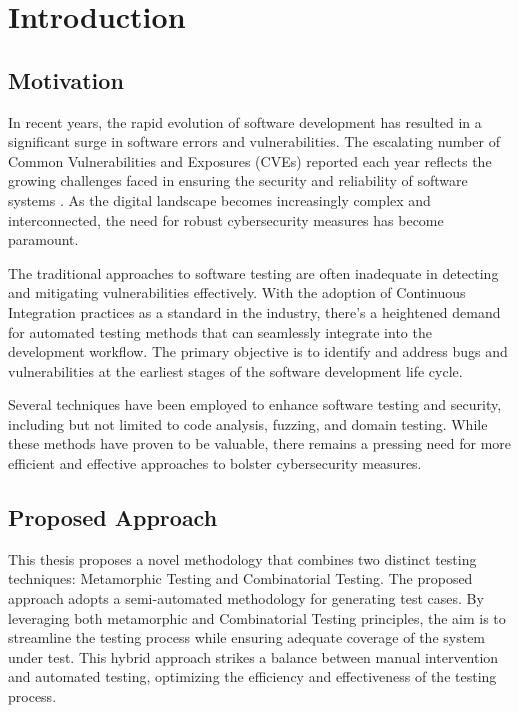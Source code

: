 
\chapter{Introduction}\label{ch:intro}

\section{Motivation}\label{sec:motivation}

In recent years, the rapid evolution of software development has resulted in a significant surge in software errors and vulnerabilities.
The escalating number of Common Vulnerabilities and Exposures (CVEs) reported each year reflects the growing challenges faced in ensuring the security and reliability of software systems \cite{CVE}.
As the digital landscape becomes increasingly complex and interconnected, the need for robust cybersecurity measures has become paramount.

The traditional approaches to software testing are often inadequate in detecting and mitigating vulnerabilities effectively.
With the adoption of Continuous Integration practices as a standard in the industry, there's a heightened demand for automated testing methods that can seamlessly integrate into the development workflow.
The primary objective is to identify and address bugs and vulnerabilities at the earliest stages of the software development life cycle.

Several techniques have been employed to enhance software testing and security, including but not limited to code analysis, fuzzing, and domain testing.
While these methods have proven to be valuable, there remains a pressing need for more efficient and effective approaches to bolster cybersecurity measures.


\section{Proposed Approach}\label{sec:proposed-approach}

This thesis proposes a novel methodology that combines two distinct testing techniques: Metamorphic Testing and Combinatorial Testing.
The proposed approach adopts a semi-automated methodology for generating test cases.
By leveraging both metamorphic and Combinatorial Testing principles, the aim is to streamline the testing process while ensuring adequate coverage of the system under test.
This hybrid approach strikes a balance between manual intervention and automated testing, optimizing the efficiency and effectiveness of the testing process.

